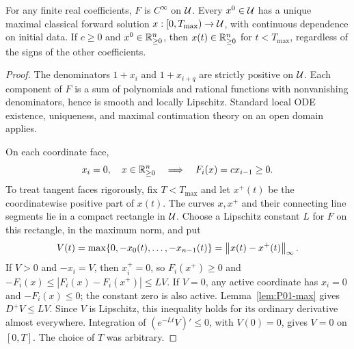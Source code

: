 \begin{proposition}
\label{prop:P01-local}
For any finite real coefficients, $F$ is $C^\infty$ on $\mathcal{U}$.
Every $x^0\in\mathcal{U}$ has a unique maximal classical forward solution
$x:[0,T_{\max})\to\mathcal{U}$, with continuous dependence on initial data.
If $c\ge0$ and $x^0\in\mathbb{R}_{\geq 0}^{n}$, then $x(t)\in\mathbb{R}_{\geq 0}^{n}$ for $t<T_{\max}$,
regardless of the signs of the other coefficients.
\end{proposition}
\begin{proof}
The denominators $1+x_i$ and $1+x_{i+q}$ are strictly positive on
$\mathcal{U}$. Each component of $F$ is a sum of polynomials and rational
functions with nonvanishing denominators, hence is smooth and locally
Lipschitz. Standard local ODE existence, uniqueness, and maximal
continuation theory on an open domain applies.

On each coordinate face,
\begin{equation}
\label{eq:P01-face}
 x_i=0,\quad x\in\mathbb{R}_{\geq 0}^{n}\quad\Longrightarrow\quad F_i(x)=c x_{i-1}\ge0.
\end{equation}
To treat tangent faces rigorously, fix $T<T_{\max}$ and let $x^+(t)$
be the coordinatewise positive part of $x(t)$. The curves $x,x^+$ and
their connecting line segments lie in a compact rectangle in $\mathcal{U}$.
Choose a Lipschitz constant $L$ for $F$ on this rectangle, in the
maximum norm, and put
\[
 V(t)=\max\{0,-x_0(t),\ldots,-x_{n-1}(t)\}
      =\left\lVert x(t)-x^+(t)\right\rVert_\infty.
\]
If $V>0$ and $-x_i=V$, then $x_i^+=0$, so
$F_i(x^+)\ge0$ and $-F_i(x)\le |F_i(x)-F_i(x^+)|\le LV$.
If $V=0$, any active coordinate has $x_i=0$ and $-F_i(x)\le0$;
the constant zero is also active. Lemma~\ref{lem:P01-max} gives
$D^+V\le LV$. Since $V$ is Lipschitz, this inequality holds for its
ordinary derivative almost everywhere. Integration of
$(e^{-Lt}V)' \le0$, with $V(0)=0$, gives $V=0$ on $[0,T]$.
The choice of $T$ was arbitrary.
\end{proof}


